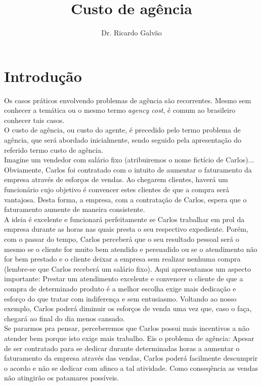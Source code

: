 \documentclass[jou,apacite]{apa6}
\title{Custo de agência}
\author{Dr. Ricardo Galvão}
\affiliation{https://github.com/rcgalvao/financas}
\begin{document}
\maketitle    
                        
\section{Introdução}
Os casos práticos envolvendo problemas de agência são recorrentes. Mesmo sem conhecer a temática ou o mesmo termo \textit{agency cost}, é comum ao brasileiro conhecer tais casos. \\
O custo de agência, ou custo do agente, é precedido pelo termo problema de agência, que será abordado inicialmente, sendo seguido pela apresentação do referido termo custo de agência.\\
Imagine um vendedor com salário fixo (atribuiremos o nome fictício de Carlos)... Obviamente, Carlos foi contratado com o intuito de aumentar o faturamento da empresa através de esforços de vendas. Ao chegarem clientes, haverá um funcionário cujo objetivo é convencer estes clientes de que a compra será vantajosa. Desta forma, a empresa, com a contratação de Carlos, espera que o faturamento aumente de maneira consistente.\\
A ideia é excelente e funcionará perfeitamente se Carlos trabalhar em prol da empresa durante as horas nas quais presta o seu respectivo expediente. Porém, com o passar do tempo, Carlos perceberá que o seu resultado pessoal será o mesmo se o cliente for muito bem atendido e persuadido ou se o atendimento não for bem prestado e o cliente deixar a empresa sem realizar nenhuma compra (lembre-se que Carlos receberá um salário fixo). Aqui apresentamos um aspecto importante: Prestar um atendimento excelente e convencer o cliente de que a compra de determinado produto é a melhor escolha exige mais dedicação e esforço do que tratar com indiferença e sem entusiasmo. Voltando ao nosso exemplo, Carlos poderá diminuir os esforços de venda uma vez que, caso o faça, chegará ao final do dia menos cansado.\\
Se pararmos pra pensar, perceberemos que Carlos possui mais incentivos a não atender bem porque isto exige mais trabalho. Eis o problema de agência: Apesar de ser contratado para se dedicar durante determinadas horas a aumentar o faturamento da empresa através das vendas, Carlos poderá facilmente descumprir o acordo e não se dedicar com afinco a tal atividade. Como conseqência as vendas não atingirão os patamares possíveis.\\
\end{document}

